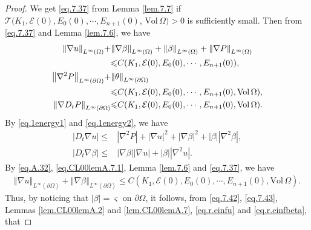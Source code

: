 \documentclass[12pt,reqno]{amsart}
\numberwithin{equation}{section}
\theoremstyle{definition}
\theoremstyle{remark}
\begin{document}
\begin{proof}
  We get \eqref{eq.7.37} from Lemma \ref{lem.7.7} if ${\mathcal{T}}(K_1,{\mathcal{E}}(0),E_0(0),\cdots, E_{n+1}(0)$, ${\mathrm{Vol}\,}\Omega)>0$ is sufficiently small. Then from \eqref{eq.7.37} and Lemma \ref{lem.7.6}, we have
  \begin{align}
    {\left\Vert{{\nabla} u}\right\Vert}_{L^\infty(\Omega)}+&{\left\Vert{{\nabla} \beta}\right\Vert}_{L^\infty(\Omega)} +{\left\Vert{ \beta}\right\Vert}_{L^\infty(\Omega)}+{\left\Vert{{\nabla} {P }}\right\Vert}_{L^\infty(\Omega)}{\nonumber}\\
    &{\leqslant} C(K_1,{\mathcal{E}}(0),E_0(0),\cdots, E_{n+1}(0)),\label{eq.7.42}\\
    {\left\Vert{{\nabla}^2{P }}\right\Vert}_{L^\infty({\partial}\Omega)}+&{\left\Vert{\theta}\right\Vert}_{L^\infty({\partial}\Omega)}{\nonumber}\\
    &{\leqslant} C(K_1,{\mathcal{E}}(0),E_0(0),\cdots, E_{n+1}(0),{\mathrm{Vol}\,}\Omega),\label{eq.7.43}\\
{\left\Vert{{\nabla} D_t{P }}\right\Vert}_{L^\infty({\partial}\Omega)}&{\leqslant} C(K_1,{\mathcal{E}}(0),E_0(0),\cdots, E_{n+1}(0),{\mathrm{Vol}\,}\Omega).\label{eq.7.44}
  \end{align}
  By \eqref{eq.1energy1} and \eqref{eq.1energy2}, we have
  \begin{align}
    {\left\vert{D_t{\nabla} u}\right\vert}{\leqslant}& {\left\vert{{\nabla}^2 {P }}\right\vert}+{\left\vert{{\nabla} u}\right\vert}^2+{\left\vert{{\nabla} \beta}\right\vert}^2+{\left\vert{\beta}\right\vert}{\left\vert{{\nabla}^2\beta}\right\vert},\\
    {\left\vert{D_t {\nabla}\beta}\right\vert}{\leqslant}& {\left\vert{{\nabla}\beta}\right\vert}{\left\vert{{\nabla} u}\right\vert}+{\left\vert{\beta}\right\vert}{\left\vert{{\nabla}^2 u}\right\vert}.\label{eq.e.10}
  \end{align}
  By \eqref{eq.A.32}, \eqref{eq.CL00lemA.7.1}, Lemma \ref{lem.7.6} and \eqref{eq.7.37}, we have
  \begin{align*}
    {\left\Vert{{\nabla} u}\right\Vert}_{L^\infty({\partial}\Omega)}+{\left\Vert{{\nabla} \beta}\right\Vert}_{L^\infty({\partial}\Omega)}{\leqslant} C(K_1,{\mathcal{E}}(0),E_0(0),\cdots, E_{n+1}(0),{\mathrm{Vol}\,}\Omega).
  \end{align*}
  Thus, by noticing that $|\beta|={\varsigma}$ on ${\partial}\Omega$, it follows, from \eqref{eq.7.42}, \eqref{eq.7.43}, Lemmas \ref{lem.CL00lemA.2} and \ref{lem.CL00lemA.7}, \eqref{eq.r.einfu} and \eqref{eq.r.einfbeta}, that

\end{proof}
\end{document}
